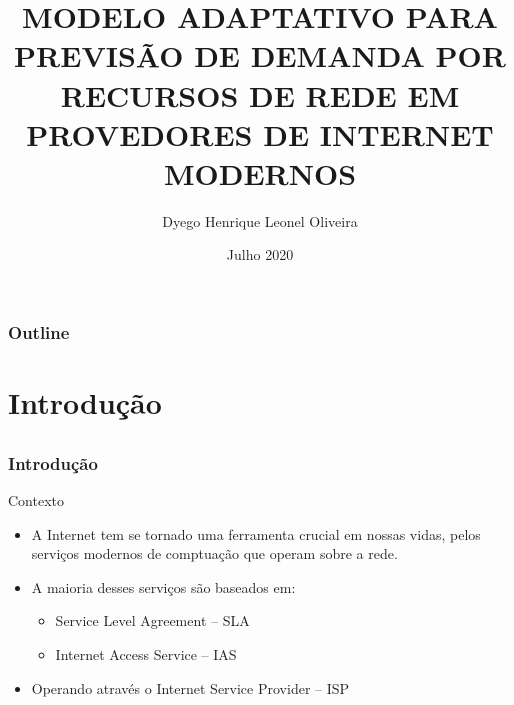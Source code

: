 \documentclass[aspectratio=169]{beamer}
\begin{document}
\title[]{\textbf{MODELO ADAPTATIVO PARA PREVISÃO DE DEMANDA POR RECURSOS DE REDE EM PROVEDORES DE INTERNET MODERNOS}}  

\author[Dyego Oliveira]{Dyego Henrique Leonel Oliveira}


\date{Julho 2020} 

\begin{frame}
\titlepage

\end{frame}


\begin{frame}
\frametitle{Outline }
\tableofcontents
\end{frame} 


\section{Introdução}


\subsection{}
\begin{frame}
\frametitle{Introdução}
\begin{block}{Contexto}
    \begin{itemize}
        \item A Internet tem se tornado uma ferramenta crucial em nossas vidas, pelos serviços modernos de comptuação que operam sobre a rede.
        \item A maioria desses serviços são baseados em:
        \begin{itemize}
            \item Service Level Agreement -- SLA
            \item Internet Access Service -- IAS
        \end{itemize}
        \item Operando através o Internet Service Provider -- ISP
    \end{itemize}
\end{block}


\end{frame}
\end{document}
